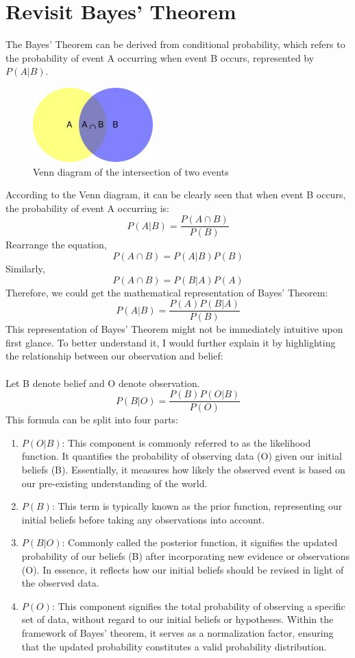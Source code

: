\documentclass{article}
\begin{document}
\section{Revisit Bayes' Theorem}
The Bayes' Theorem can be derived from conditional probability, which refers to the probability of event A occurring when event B occurs, represented by $P(A|B)$.
\begin{figure}[!htbp]
    \centering
    \includegraphics{Picture2.jpg}
    \caption{Venn diagram of the intersection of two events}
    \label{fig:enter-label}
\end{figure}
\FloatBarrier
According to the Venn diagram, it can be clearly seen that when event B occurs, the probability of event A occurring is:
\[P(A|B)=\frac{P(A \cap B)}{P(B)}\]
Rearrange the equation,
\[P(A \cap B)=P(A|B)P(B)\]
Similarly,
\[P(A \cap B)=P(B|A)P(A)\]
Therefore, we could get the mathematical representation of Bayes' Theorem:
\[P(A|B)=\frac{P(A)P(B|A)}{P(B)}\]
This representation of Bayes' Theorem might not be immediately intuitive upon first glance. To better understand it, I would further explain it by highlighting the relationship between our observation and belief:\\\\
Let B denote belief and O denote observation.
\[P(B|O)=\frac{P(B)P(O|B)}{P(O)}\]
This formula can be split into four parts:
\begin{enumerate}
    \item $P(O|B)$: This component is commonly referred to as the likelihood function. It quantifies the probability of observing data (O) given our initial beliefs (B). Essentially, it measures how likely the observed event is based on our pre-existing understanding of the world.
    \item $P(B)$: This term is typically known as the prior function, representing our initial beliefs before taking any observations into account.
    \item $P(B|O)$: Commonly called the posterior function, it signifies the updated probability of our beliefs (B) after incorporating new evidence or observations (O). In essence, it reflects how our initial beliefs should be revised in light of the observed data.
    \item $P(O)$: This component signifies the total probability of observing a specific set of data, without regard to our initial beliefs or hypotheses. Within the framework of Bayes' theorem, it serves as a normalization factor, ensuring that the updated probability constitutes a valid probability distribution.
\end{enumerate}
\end{document}

